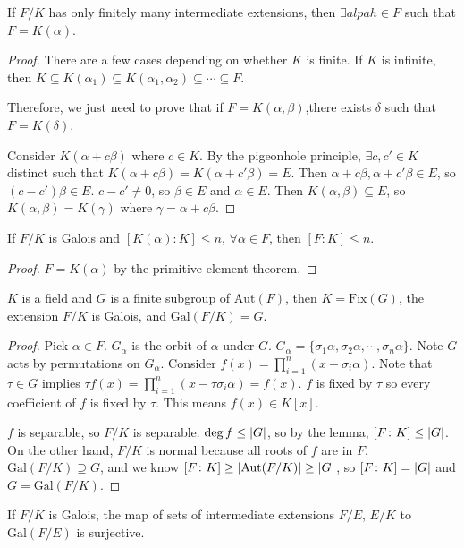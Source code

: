 \documentclass[a4paper,twoside,master.tex]{subfiles}
\begin{document}
\begin{theorem}
    If $ F/K $ has only finitely many intermediate extensions, then $ \exists alpah \in F $ such that $ F = K(\alpha) $.
\end{theorem}
\begin{proof}
    There are a few cases depending on whether $ K $ is finite. If $ K $ is infinite, then $ K \subseteq K(\alpha_1) \subseteq K(\alpha_1, \alpha_2) \subseteq \cdots \subseteq F $.

    Therefore, we just need to prove that if $ F = K(\alpha, \beta) $,there exists $ \delta $ such that $ F = K(\delta) $.

    Consider $ K(\alpha + c \beta) $ where $ c \in K $. By the pigeonhole principle, $ \exists c,c' \in K $ distinct such that $ K(\alpha + c \beta) = K(\alpha + c' \beta) = E $. Then $ \alpha + c \beta, \alpha + c' \beta \in E $, so $ (c-c') \beta \in E $. $ c-c' \neq 0 $, so $ \beta \in E $ and $ \alpha \in E $. Then $ K(\alpha, \beta) \subseteq E $, so $ K(\alpha, \beta) = K(\gamma) $ where $ \gamma = \alpha + c \beta $.
\end{proof}

\begin{lemma}
    If $ F/K $ is Galois and $ [K(\alpha) \colon K] \leq n $, $ \forall \alpha \in F $, then $ [F\colon K] \leq n $.
\end{lemma}
\begin{proof}
    $ F = K(\alpha) $ by the primitive element theorem.
\end{proof}
\begin{theorem}
    $ K $ is a field and $ G $ is a finite subgroup of $ \text{Aut}(F) $, then $ K = \text{Fix}(G) $, the extension $ F/K $ is Galois, and $ \text{Gal}(F/K) = G $.
\end{theorem}
\begin{proof}
    Pick $ \alpha \in F $. $ G_{\alpha} $ is the orbit of $ \alpha $ under $ G $. $ G_{\alpha} = \{\sigma_1 \alpha, \sigma_2 \alpha, \cdots, \sigma_n \alpha\} $. Note $ G $ acts by permutations on $ G_{\alpha} $. Consider $ f(x) = \prod_{i=1}^{n} (x - \sigma_i \alpha) $. Note that $ \tau \in G $ implies $ \tau f(x) = \prod_{i=1}^{n}(x - \tau \sigma_i \alpha) = f(x) $. $ f $ is fixed by $ \tau $ so every coefficient of $ f $ is fixed by $ \tau $. This means $ f(x) \in K[x] $.

    $ f $ is separable, so $ F/K $ is separable. $ \deg f \leq \abs{G} $, so by the lemma, $ [F\colon K] \leq \abs{G} $. On the other hand, $ F/K $ is normal because all roots of $ f $ are in $ F $. $ \text{Gal}(F/K) \supseteq G $, and we know $ [F\colon K] \geq \abs{\text{Aut}(F/K)} \geq \abs{G} $, so $ [F\colon K] = \abs{G} $ and $ G = \text{Gal}(F/K) $.
\end{proof}
\begin{corollary}
    If $ F/K $ is Galois, the map of sets of intermediate extensions $ F/E $, $ E/K $ to $ \text{Gal}(F/E) $ is surjective.
\end{corollary}
\end{document}
